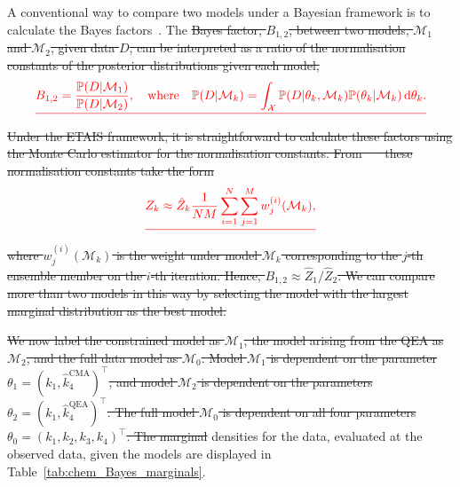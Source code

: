 \documentclass[final]{siamltex}
\providecommand{\DIFadd}[1]{{\protect\color{blue}\uwave{#1}}} %
\providecommand{\DIFdel}[1]{{\protect\color{red}\sout{#1}}}                      %
\providecommand{\DIFaddbegin}{} %
\providecommand{\DIFaddend}{} %
\providecommand{\DIFdelbegin}{} %
\providecommand{\DIFdelend}{} %
\newcommand{\DIFscaledelfig}{0.5}
\newlength{\DIFdelgraphicswidth} %
\newlength{\DIFdelgraphicsheight} %
\newcommand{\DIFaddincludegraphics}[2][]{{\color{blue}\fbox{\DIFOincludegraphics[#1]{#2}}}} %
\newcommand{\DIFdelincludegraphics}[2][]{%
\sbox{\DIFdelgraphicsbox}{\DIFOincludegraphics[#1]{#2}}%
\settoboxwidth{\DIFdelgraphicswidth}{\DIFdelgraphicsbox} %
\settoboxtotalheight{\DIFdelgraphicsheight}{\DIFdelgraphicsbox} %
\scalebox{\DIFscaledelfig}{%
\parbox[b]{\DIFdelgraphicswidth}{\usebox{\DIFdelgraphicsbox}\\[-\baselineskip] \rule{\DIFdelgraphicswidth}{0em}}\llap{\resizebox{\DIFdelgraphicswidth}{\DIFdelgraphicsheight}{%
\setlength{\unitlength}{\DIFdelgraphicswidth}%
\begin{picture}(1,1)%
\thicklines\linethickness{2pt} %
{\color[rgb]{1,0,0}\put(0,0){\framebox(1,1){}}}%
{\color[rgb]{1,0,0}\put(0,0){\line( 1,1){1}}}%
{\color[rgb]{1,0,0}\put(0,1){\line(1,-1){1}}}%
\end{picture}%
}\hspace*{3pt}}} %
} %
\DeclareRobustCommand{\DIFaddbegin}{\DIFOaddbegin \let\includegraphics\DIFaddincludegraphics} %
\DeclareRobustCommand{\DIFaddend}{\DIFOaddend \let\includegraphics\DIFOincludegraphics} %
\DeclareRobustCommand{\DIFdelbegin}{\DIFOdelbegin \let\includegraphics\DIFdelincludegraphics} %
\DeclareRobustCommand{\DIFdelend}{\DIFOaddend \let\includegraphics\DIFOincludegraphics} %
\begin{document}

\DIFaddend A conventional way to compare two models under a Bayesian framework is
to calculate the Bayes factors~\cite{chen2012monte}. The \DIFdelbegin \DIFdel{Bayes factor,
$B_{1,2}$, between two models, $\mathcal{M}_1$ and $\mathcal{M}_2$,
given data $D$, can be interpreted as a ratio of the normalisation constants of the posterior distributions given each model,
}\[
	\DIFdel{B_{1,2} = \frac{\mathbb{P}(D|\mathcal{M}_1)}{\mathbb{P}(D|\mathcal{M}_2)}, \quad \text{where} \quad \mathbb{P}(D|\mathcal{M}_k) = \int_\mathcal{X} \mathbb{P}(D|\theta_k,\mathcal{M}_k)\mathbb{P}(\theta_k|\mathcal{M}_k) \, \text{d}\theta_k.
}\]
\DIFdel{Under the ETAIS framework, it is straightforward to calculate these factors using the Monte Carlo estimator for the normalisation constants. From~\mbox{%
\cite{robert2013monte} }\hspace{0pt}%
these normalisation constants take the form
}\[
	\DIFdel{Z_k \approx \hat{Z}_k\frac{1}{NM}\sum_{i=1}^N\sum_{j=1}^M w_j^{(i)}(\mathcal{M}_k),
}\]
\DIFdel{where $w_j^{(i)}(\mathcal{M}_k)$ is the weight under model $\mathcal{M}_k$ corresponding to the $j$-th ensemble member on the $i$-th iteration. Hence, $B_{1,2} \approx \hat{Z}_1/\hat{Z}_2$. We can compare more than two models in this way by selecting the model with the largest marginal distribution as the best model.
}%

\DIFdel{We now label the constrained model as $\mathcal{M}_1$, the model
arising from the QEA as $\mathcal{M}_2$, and the full data model as
$\mathcal{M}_0$. Model $\mathcal{M}_1$ is dependent on the parameter
$\theta_1 = (k_1, \hat{k}_4^{\text{CMA}})^\top$, and model
$\mathcal{M}_2$ is dependent on the parameters $\theta_2 = (k_1,
\hat{k}_4^{\text{QEA}})^\top$. The full model $\mathcal{M}_0$ is
dependent on all four parameters $\theta_0 = (k_1, k_2, k_3, k_4)^\top$. The marginal }\DIFdelend \DIFaddbegin \DIFadd{marginal }\DIFaddend densities for the data, evaluated at the observed data, given the models are displayed in Table~\ref{tab:chem_Bayes_marginals}.
\end{document}
